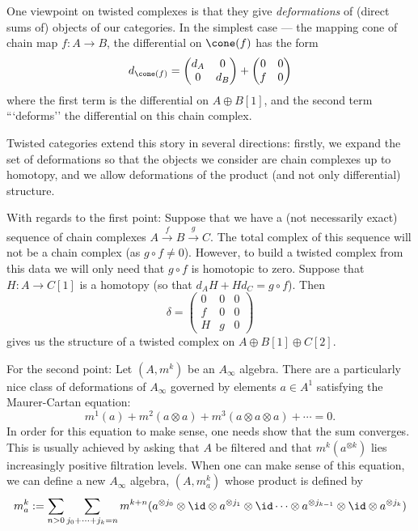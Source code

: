 
 


    One viewpoint on twisted complexes is that they give \emph{deformations} of (direct sums of) objects of our categories. In the simplest case --- the mapping cone of chain map $f: A\to B$, the differential on $\cone(f)$ has the form 
    \[d_{\cone(f)}=\begin{pmatrix} d_A & 0 \\ 0 & d_B \end{pmatrix} + \begin{pmatrix} 0 & 0\\ f & 0\end{pmatrix}\]
    where the first term is the differential on $A\oplus B[1]$, and the second term ```deforms'' the differential on this chain complex.

    Twisted categories extend this story in several directions: firstly, we expand the set of deformations so that the objects we consider are chain complexes up to homotopy, and we allow deformations of the product (and not only differential) structure.

    With regards to the first point: Suppose that we have a (not necessarily exact) sequence of chain complexes $A\xrightarrow{f} B \xrightarrow{g} C$. The total complex of this sequence will not be a chain complex (as $g\circ f \neq 0$). However, to build a twisted complex from this data we will only need that $g\circ f$ is homotopic to zero. Suppose that  $H:A\to C[1]$ is a homotopy (so that $d_AH+Hd_C=g\circ f$). Then  
    \[\delta = \begin{pmatrix}
        0 & 0 & 0\\
        f & 0 & 0\\
        H & g & 0
    \end{pmatrix}\]
    gives us the structure of a twisted complex on $A\oplus B[1]\oplus C[2]$.

    For the second point: Let $(A, m^k)$ be an $A_\infty$ algebra. There are a particularly nice class of deformations of $A_\infty$ governed by elements $a\in A^1$ satisfying the Maurer-Cartan equation:
    \[m^1(a)+m^2(a\otimes a)+m^3(a\otimes a \otimes a)+\cdots =0.\]
    In order for this equation to make sense, one needs show that the sum converges. This is usually achieved by asking that $A$ be filtered and that $m^k(a^{\otimes k})$ lies increasingly positive filtration levels.
    When one can make sense of this equation, we can define a new $A_\infty$ algebra, $(A, m^k_a)$ whose product is defined by 
    \[m^k_a:=\sum_{n>0}\sum_{j_0+\cdots+j_k=n} m^{k+n}(a^{\otimes j_0}\otimes \id \otimes a^{\otimes j_1}\otimes \id \cdots \otimes a^{\otimes j_{k-1}}\otimes \id \otimes a^{\otimes j_k})\]

